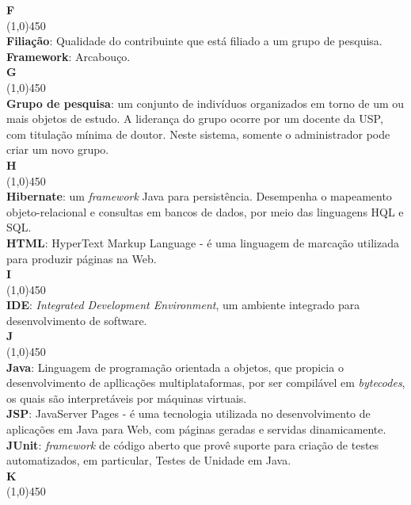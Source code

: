 \documentclass[11pt, a4paper]{article}
\begin{document}
	\noindent\textbf{\huge{F}}\\
	\line(1,0){450}\\
	\textbf{Filiação}: Qualidade do contribuinte que está filiado a um grupo de pesquisa.\\
	\textbf{Framework}: Arcabouço.\\

	\noindent\textbf{\huge{G}}\\
	\line(1,0){450}\\
	\textbf{Grupo de pesquisa}: um conjunto de indivíduos organizados em torno de um ou mais objetos de estudo. A liderança do grupo ocorre por um docente da USP, com titulação mínima de doutor. Neste sistema, somente o administrador pode criar um novo grupo.\\
	
	\noindent\textbf{\huge{H}}\\
	\line(1,0){450}\\
	\textbf{Hibernate}: um \emph{framework} Java para persistência. Desempenha o mapeamento objeto-relacional e consultas em bancos de dados, por meio das linguagens HQL e SQL.\\
	\textbf{HTML}: HyperText Markup Language - é uma linguagem de marcação 
	utilizada para produzir páginas na Web.\\
	
	\noindent\textbf{\huge{I}}\\
	\line(1,0){450}\\
	\textbf{IDE}: \emph{Integrated Development Environment}, um ambiente integrado 
	para desenvolvimento de software.\\
	
	\noindent\textbf{\huge{J}}\\
	\line(1,0){450}\\
	\textbf{Java}: Linguagem de programação orientada a objetos, que propicia o desenvolvimento de apllicações multiplataformas, por ser compilável em \emph{bytecodes}, os quais são interpretáveis por máquinas virtuais.\\
	\textbf{JSP}: JavaServer Pages - é uma tecnologia utilizada no 
	desenvolvimento de aplicações em Java para Web, com páginas geradas e servidas dinamicamente.\\
	\textbf{JUnit}: \emph{framework} de código aberto que provê suporte para criação de testes automatizados, em particular, Testes de Unidade em Java.\\
	
	\noindent\textbf{\huge{K}}\\
	\line(1,0){450}\\
		
\end{document}

